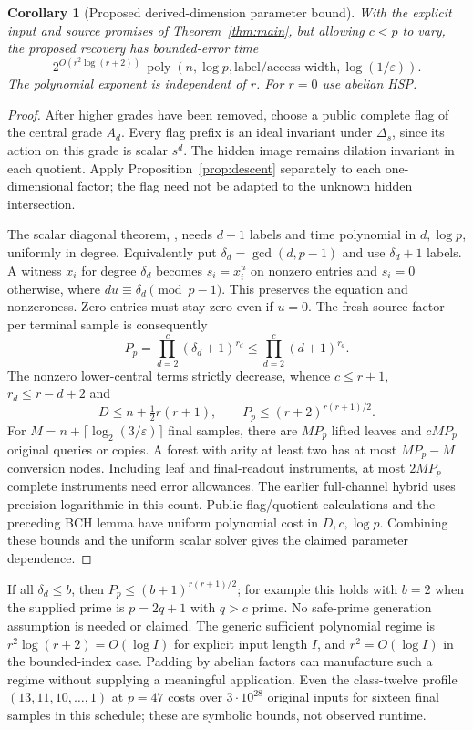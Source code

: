 \documentclass[11pt]{article}
\newtheorem{corollary}[theorem]{Corollary}
\theoremstyle{remark}
\newcommand{\eps}{\varepsilon}
\begin{document}
\begin{corollary}[Proposed derived-dimension parameter bound]
With the explicit input and source promises of Theorem~\ref{thm:main},
but allowing $c<p$ to vary, the proposed recovery has bounded-error time
\[
 2^{O(r^2\log(r+2))}\,
 \operatorname{poly}(n,\log p,\text{label/access width},\log(1/\eps)).
\]
The polynomial exponent is independent of $r$. For $r=0$ use abelian HSP.
\end{corollary}
\begin{proof}
After higher grades have been removed, choose a public complete flag of
the central grade $A_d$. Every flag prefix is an ideal invariant under
$\Delta_s$, since its action on this grade is scalar $s^d$. The hidden
image remains dilation invariant in each quotient. Apply
Proposition~\ref{prop:descent} separately to each one-dimensional factor;
the flag need not be adapted to the unknown hidden intersection.

The scalar diagonal theorem, \cite[Fact 2]{is}, needs $d+1$ labels and
time polynomial in $d,\log p$, uniformly in degree. Equivalently put
$\delta_d=\gcd(d,p-1)$ and use $\delta_d+1$ labels. A witness $x_i$ for
degree $\delta_d$ becomes $s_i=x_i^u$ on nonzero entries and $s_i=0$
otherwise, where $du\equiv\delta_d\pmod {p-1}$. This preserves the
equation and nonzeroness. Zero entries must stay zero even if $u=0$.
The fresh-source factor per terminal sample is consequently
\[
 P_p=\prod_{d=2}^c(\delta_d+1)^{r_d}
 \le \prod_{d=2}^c(d+1)^{r_d}.
\]
The nonzero lower-central terms strictly decrease, whence
$c\le r+1$, $r_d\le r-d+2$ and
\[
 D\le n+\tfrac12r(r+1),\qquad
 P_p\le (r+2)^{r(r+1)/2}.
\]
For $M=n+\lceil\log_2(3/\eps)\rceil$ final samples, there are $MP_p$
lifted leaves and $cMP_p$ original queries or copies. A forest with
arity at least two has at most $MP_p-M$ conversion nodes. Including leaf
and final-readout instruments, at most $2MP_p$ complete instruments need
error allowances. The earlier full-channel hybrid uses precision logarithmic
in this count. Public flag/quotient calculations and the preceding BCH
lemma have uniform polynomial cost in $D,c,\log p$. Combining these bounds
and the uniform scalar solver gives the claimed parameter dependence.
\end{proof}

If all $\delta_d\le b$, then $P_p\le(b+1)^{r(r+1)/2}$; for example this
holds with $b=2$ when the supplied prime is $p=2q+1$ with $q>c$ prime.
No safe-prime generation assumption is needed or claimed. The generic
sufficient polynomial regime is $r^2\log(r+2)=O(\log I)$ for explicit
input length $I$, and $r^2=O(\log I)$ in the bounded-index case.
Padding by abelian factors can manufacture such a regime without supplying
a meaningful application. Even the class-twelve profile $(13,11,10,\ldots,1)$
at $p=47$ costs over $3\cdot10^{28}$ original inputs for sixteen final
samples in this schedule; these are symbolic bounds, not observed runtime.
\end{document}
